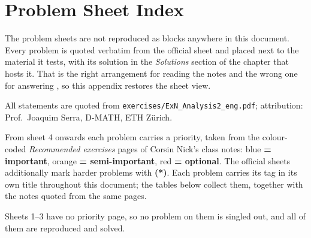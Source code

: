 %
%
\chapter{Problem Sheet Index}
\label{ch:sheet_index}

The problem sheets are not reproduced as blocks anywhere in this document. Every problem is
quoted verbatim from the official sheet and placed next to the material it tests, with its
solution in the \emph{Solutions} section of the chapter that hosts it. That is the right
arrangement for reading the notes and the wrong one for answering , so
this appendix restores the sheet view.

All statements are quoted from \texttt{exercises/ExN\_Analysis2\_eng.pdf}; attribution:
Prof.\ Joaquim Serra, D-MATH, ETH Z\"urich.

\begin{notation}
\label{not:priority_key}
From sheet 4 onwards each problem carries a priority, taken from the colour-coded
\textit{Recommended exercises} pages of Corsin Nick's class notes: %
blue \textbf{= important},
orange \textbf{= semi-important}, red \textbf{= optional}. The official sheets additionally mark
harder problems with \textbf{(*)}. Each problem carries its tag in its own title throughout this
document; the tables below collect them, together with the notes quoted from the same pages.
\end{notation}

\begin{ainote}
Sheets 1--3 have no priority page, so no problem on them is singled out, and all of them are
reproduced and solved.
\end{ainote}

